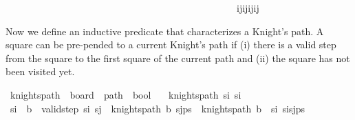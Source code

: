 \begin{isabellebody}
\ \ \ \ \ \ \ \ \ \ \ \ \ \ \ \ \ \ \ \ \ \ \ \ \ \ \ \ \ \ \ \ \ \ \ \ \ \ \ \ \ \ \ \ \ \ \ \ {\isacharparenleft}{\kern0pt}i{\isacharplus}{\kern0pt}{}{\isacharcomma}{\kern0pt}j{\isacharplus}{\kern0pt}{}{\isacharparenright}{\kern0pt}{\isacharcomma}{\kern0pt}{\isacharparenleft}{\kern0pt}i{\isacharminus}{\kern0pt}{}{\isacharcomma}{\kern0pt}j{\isacharplus}{\kern0pt}{}{\isacharparenright}{\kern0pt}{\isacharcomma}{\kern0pt}{\isacharparenleft}{\kern0pt}i{\isacharplus}{\kern0pt}{}{\isacharcomma}{\kern0pt}j{\isacharminus}{\kern0pt}{}{\isacharparenright}{\kern0pt}{\isacharcomma}{\kern0pt}{\isacharparenleft}{\kern0pt}i{\isacharminus}{\kern0pt}{}{\isacharcomma}{\kern0pt}j{\isacharminus}{\kern0pt}{}{\isacharparenright}{\kern0pt}{\isacharbraceright}{\kern0pt}{\isacharparenright}{\kern0pt}{\isachardoublequoteclose}%
\begin{isamarkuptext}%
Now we define an inductive predicate that characterizes a Knight's path. A square  can be
pre-pended to a current Knight's path  if (i) there is a valid step from the square  to 
the first square  of the current path and (ii) the square  has not been visited yet.%
\end{isamarkuptext}\isamarkuptrue%
\isamarkupfalse%
\ knights{\isacharunderscore}{\kern0pt}path\ {\isacharcolon}{\kern0pt}{\isacharcolon}{\kern0pt}\ {\isachardoublequoteopen}board\ {\isasymRightarrow}\ path\ {\isasymRightarrow}\ bool{\isachardoublequoteclose}\ \isanewline
\ \ {\isachardoublequoteopen}knights{\isacharunderscore}{\kern0pt}path\ {\isacharbraceleft}{\kern0pt}s\isactrlsub i{\isacharbraceright}{\kern0pt}\ {\isacharbrackleft}{\kern0pt}s\isactrlsub i{\isacharbrackright}{\kern0pt}{\isachardoublequoteclose}\isanewline
{\isacharbar}{\kern0pt}\ {\isachardoublequoteopen}s\isactrlsub i\ {\isasymnotin}\ b\ {\isasymLongrightarrow}\ valid{\isacharunderscore}{\kern0pt}step\ s\isactrlsub i\ s\isactrlsub j\ {\isasymLongrightarrow}\ knights{\isacharunderscore}{\kern0pt}path\ b\ {\isacharparenleft}{\kern0pt}s\isactrlsub j{\isacharhash}{\kern0pt}ps{\isacharparenright}{\kern0pt}\ {\isasymLongrightarrow}\ knights{\isacharunderscore}{\kern0pt}path\ {\isacharparenleft}{\kern0pt}b\ {\isasymunion}\ {\isacharbraceleft}{\kern0pt}s\isactrlsub i{\isacharbraceright}{\kern0pt}{\isacharparenright}{\kern0pt}\ {\isacharparenleft}{\kern0pt}s\isactrlsub i{\isacharhash}{\kern0pt}s\isactrlsub j{\isacharhash}{\kern0pt}ps{\isacharparenright}{\kern0pt}{\isachardoublequoteclose}\isanewline

\end{isabellebody}
